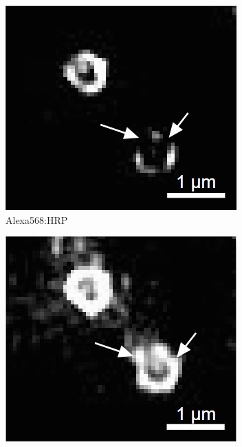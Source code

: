 \begin{figure}
	\hspace{-0.1cm}
	\begin{subfigure}[t]{0.24\textwidth}
		\centering
		\includegraphics[width=\linewidth]{images/DeepSIM_NMJ_woAO_ROI2_Alexa568.jpg}
		\caption{Alexa568:HRP}
		\label{fig:DeepSIM_NMJ_woAO_ROI2_Alexa568}
	\end{subfigure}
	\hspace{0.05cm}
	\begin{subfigure}[t]{0.24\textwidth}
		\centering
		\includegraphics[width=\linewidth]{images/DeepSIM_NMJ_AO_ROI2_Alexa568.jpg}

\end{subfigure}
\end{figure}
